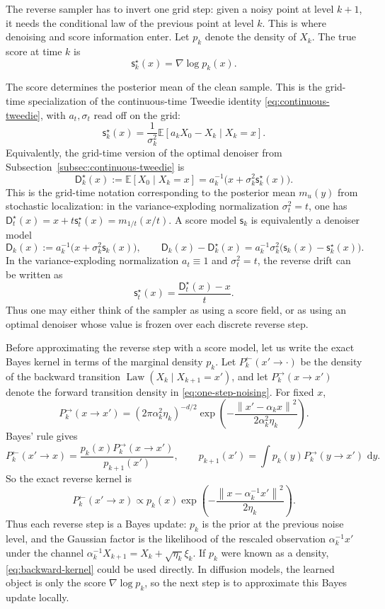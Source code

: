 \documentclass{amsart}
\numberwithin{equation}{section}
\theoremstyle{plain}
\theoremstyle{definition}
\theoremstyle{remark}
\DeclareMathOperator{\Law}{Law}
\newcommand{\E}{\mathbb{E}}
\newcommand{\dd}{\,\mathrm{d}}
\newcommand{\norm}[1]{\left\lVert #1 \right\rVert}
\newcommand{\sstar}{\mathsf{s}^{\star}}
\newcommand{\score}{\mathsf{s}}
\newcommand{\dstar}{\mathsf{D}^{\star}}
\newcommand{\denoiser}{\mathsf{D}}
\begin{document}
The reverse sampler has to invert one grid step: given a noisy point at level $k+1$, it needs the
conditional law of the previous point at level $k$.  This is where denoising and
score information enter.  Let $p_k$ denote the density of $X_k$.  The true score at time $k$ is
\[
    \sstar_k(x)=\nabla\log p_k(x).
\]

The score determines the posterior mean of the clean sample.  This is the
grid-time specialization of the continuous-time Tweedie identity
\eqref{eq:continuous-tweedie}, with $a_t,\sigma_t$ read off on the grid:
\begin{equation}\label{eq:tweedie}
    \sstar_k(x)
    =
    \frac{1}{\sigma_k^2}
    \E[a_kX_0-X_k\mid X_k=x].
\end{equation}
Equivalently, the grid-time version of the optimal denoiser from
Subsection~\ref{subsec:continuous-tweedie} is
\[
    \dstar_k(x)
    :=
    \E[X_0\mid X_k=x]
    =
    a_k^{-1}\bigl(x+\sigma_k^2\sstar_k(x)\bigr).
\]
This is the grid-time notation corresponding to the posterior mean $m_u(y)$
from stochastic localization: in the variance-exploding normalization
$\sigma_t^2=t$, one has $\dstar_t(x)=x+t\sstar_t(x)=m_{1/t}(x/t)$.
A score model $\score_k$ is equivalently a denoiser model
\[
    \denoiser_k(x)
    :=
    a_k^{-1}\bigl(x+\sigma_k^2\score_k(x)\bigr),
    \qquad
    \denoiser_k(x)-\dstar_k(x)
    =
    a_k^{-1}\sigma_k^2\bigl(\score_k(x)-\sstar_k(x)\bigr).
\]
In the variance-exploding normalization $a_t\equiv1$ and $\sigma_t^2=t$, the
reverse drift can be written as
\[
    \sstar_t(x)
    =
    \frac{\dstar_t(x)-x}{t}.
\]
Thus one may either think of the sampler as using a score field, or as using an
optimal denoiser whose value is frozen over each discrete reverse step.

Before approximating the reverse step with a score model, let us write the
exact Bayes kernel in terms of the marginal density $p_k$.  Let
$P_k^{\leftarrow}(x' \to \cdot)$ be the density of the backward transition
$\Law(X_k\mid X_{k+1}=x')$, and let $P_k^{\to}(x \to x')$ denote the forward
transition density in \eqref{eq:one-step-noising}.  For fixed $x$,
\[
    P_k^{\to}(x \to x')
    =
    (2\pi\alpha_k^2\eta_k)^{-d/2}
    \exp\left(
    -\frac{\norm{x'-\alpha_kx}^2}{2\alpha_k^2\eta_k}
    \right).
\]
Bayes' rule gives
\[
    P_k^{\leftarrow}(x' \to x)
    =
    \frac{p_k(x)P_k^{\to}(x \to x')}{p_{k+1}(x')},
    \qquad
    p_{k+1}(x')=\int p_k(y)P_k^{\to}(y \to x')\,\dd y.
\]
So the exact
reverse kernel is
\begin{equation}\label{eq:backward-kernel}
    P_k^{\leftarrow}(x' \to x)
    \propto
    p_k(x)
    \exp\!\left(
    -\frac{\norm{x-\alpha_k^{-1}x'}^2}{2\eta_k}
    \right).
\end{equation}
Thus each reverse step is a Bayes update: $p_k$ is the prior at the previous
noise level, and the Gaussian factor is the likelihood of the rescaled
observation $\alpha_k^{-1}x'$ under the channel
$\alpha_k^{-1}X_{k+1}=X_k+\sqrt{\eta_k}\xi_k$.  If $p_k$ were known as a
density, \eqref{eq:backward-kernel} could be used directly.  In diffusion
models, the learned object is only the score $\nabla\log p_k$, so the next step
is to approximate this Bayes update locally.
\end{document}
